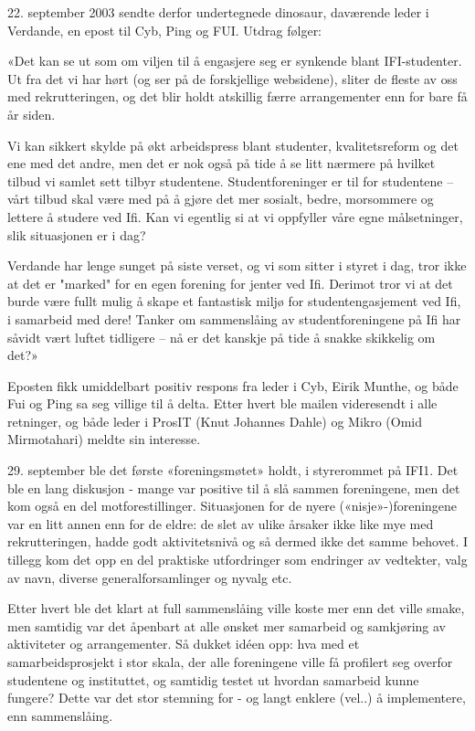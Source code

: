 \documentclass[../main.tex]{subfiles}
\begin{document}
22. september 2003 sendte derfor undertegnede dinosaur, daværende leder i Verdande, en epost til Cyb, Ping og FUI. Utdrag følger:

«Det kan se ut som om viljen til å engasjere seg er synkende blant IFI-studenter. Ut fra det vi har hørt (og ser på de forskjellige websidene), sliter de fleste av oss med rekrutteringen, og det blir holdt atskillig færre arrangementer enn for bare få år siden.

Vi kan sikkert skylde på økt arbeidspress blant studenter, kvalitetsreform og det ene med det andre, men det er nok også på tide å se litt nærmere på hvilket tilbud vi samlet sett tilbyr studentene. Studentforeninger er til for studentene -- vårt tilbud skal være med på å gjøre det mer sosialt, bedre, morsommere og lettere å studere ved Ifi. Kan vi egentlig si at vi oppfyller våre egne målsetninger, slik situasjonen er i dag?

Verdande har lenge sunget på siste verset, og vi som sitter i styret i dag, tror ikke at det er "marked" for en egen forening for jenter ved Ifi. Derimot tror vi at det burde være fullt mulig å skape et fantastisk miljø for studentengasjement ved Ifi, i samarbeid med dere! Tanker om sammenslåing av studentforeningene på Ifi har såvidt vært luftet tidligere -- nå er det kanskje på tide å snakke skikkelig om det?»

Eposten fikk umiddelbart positiv respons fra leder i Cyb, Eirik Munthe, og både Fui og Ping sa seg villige til å delta. Etter hvert ble mailen videresendt i alle retninger, og både leder i ProsIT (Knut Johannes Dahle) og Mikro (Omid Mirmotahari) meldte sin interesse.

29. september ble det første «foreningsmøtet» holdt, i styrerommet på IFI1. Det ble en lang diskusjon - mange var positive til å slå sammen foreningene, men det kom også en del motforestillinger. Situasjonen for de nyere («nisje»-)foreningene var en litt annen enn for de eldre: de slet av ulike årsaker ikke like mye med rekrutteringen, hadde godt aktivitetsnivå og så dermed ikke det samme behovet. I tillegg kom det opp en del praktiske utfordringer som endringer av vedtekter, valg av navn, diverse generalforsamlinger og nyvalg etc.

Etter hvert ble det klart at full sammenslåing ville koste mer enn det ville smake, men samtidig var det åpenbart at alle ønsket mer samarbeid og samkjøring av aktiviteter og arrangementer. Så dukket idéen opp: hva med et samarbeidsprosjekt i stor skala, der alle foreningene ville få profilert seg overfor studentene og instituttet, og samtidig testet ut hvordan samarbeid kunne fungere? Dette var det stor stemning for - og langt enklere (vel..) å implementere, enn sammenslåing.
\end{document}
